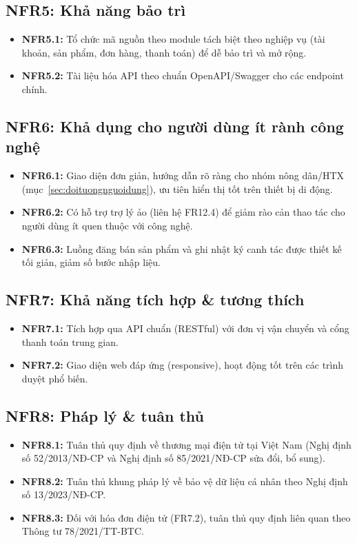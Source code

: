 \subsection{NFR5: Khả năng bảo trì}
\begin{itemize}
    \item \textbf{NFR5.1:} Tổ chức mã nguồn theo module tách biệt theo
    nghiệp vụ (tài khoản, sản phẩm, đơn hàng, thanh toán) để dễ bảo trì và
    mở rộng.
    \item \textbf{NFR5.2:} Tài liệu hóa API theo chuẩn OpenAPI/Swagger cho
    các endpoint chính.
\end{itemize}

\subsection{NFR6: Khả dụng cho người dùng ít rành công nghệ}
\begin{itemize}
    \item \textbf{NFR6.1:} Giao diện đơn giản, hướng dẫn rõ ràng cho nhóm
    nông dân/HTX (mục~\ref{sec:doituongnguoidung}), ưu tiên hiển thị tốt
    trên thiết bị di động.
    \item \textbf{NFR6.2:} Có hỗ trợ trợ lý ảo (liên hệ FR12.4) để giảm rào
    cản thao tác cho người dùng ít quen thuộc với công nghệ.
    \item \textbf{NFR6.3:} Luồng đăng bán sản phẩm và ghi nhật ký canh tác
    được thiết kế tối giản, giảm số bước nhập liệu.
\end{itemize}

\subsection{NFR7: Khả năng tích hợp \& tương thích}
\begin{itemize}
    \item \textbf{NFR7.1:} Tích hợp qua API chuẩn (RESTful) với đơn vị vận
    chuyển và cổng thanh toán trung gian.
    \item \textbf{NFR7.2:} Giao diện web đáp ứng (responsive), hoạt động
    tốt trên các trình duyệt phổ biến.
\end{itemize}

\subsection{NFR8: Pháp lý \& tuân thủ}
\begin{itemize}
    \item \textbf{NFR8.1:} Tuân thủ quy định về thương mại điện tử tại
    Việt Nam (Nghị định số 52/2013/NĐ-CP và Nghị định số 85/2021/NĐ-CP sửa
    đổi, bổ sung).
    \item \textbf{NFR8.2:} Tuân thủ khung pháp lý về bảo vệ dữ liệu cá nhân
    theo Nghị định số 13/2023/NĐ-CP.
    \item \textbf{NFR8.3:} Đối với hóa đơn điện tử (FR7.2), tuân thủ quy
    định liên quan theo Thông tư 78/2021/TT-BTC.
\end{itemize}

